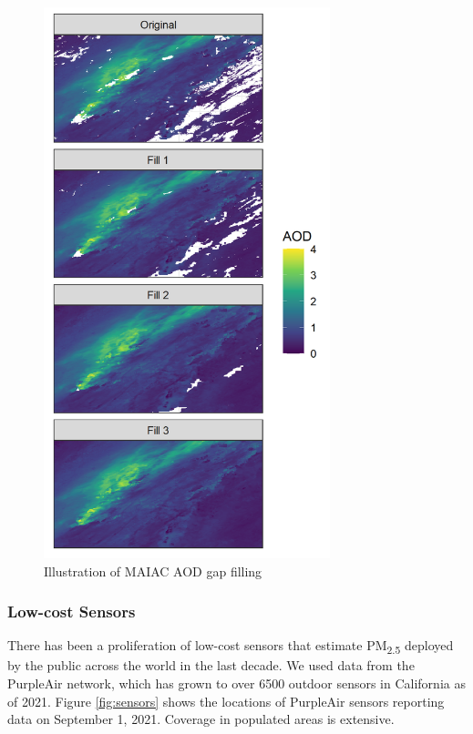 \documentclass[gmd, manuscript]{copernicus}
\begin{document}
\begin{figure}[h]
\includegraphics[width=8.3cm]{./Figures/GapFillingGMD} \caption{Illustration of MAIAC AOD gap filling}\label{fig:gapfill}
\end{figure}

\subsubsection{Low-cost Sensors}

There has been a proliferation of low-cost sensors that estimate
PM\textsubscript{2.5} deployed by the public across the world in the
last decade. We used data from the PurpleAir network, which has grown to
over 6500 outdoor sensors in California as of 2021. Figure
\ref{fig:sensors} shows the locations of PurpleAir sensors reporting
data on September 1, 2021. Coverage in populated areas is extensive.\\
\end{document}
